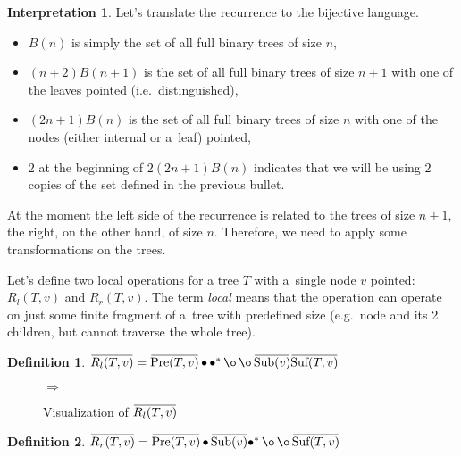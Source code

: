 \documentclass[final]{article}
\theoremstyle{definition}
\newtheorem{definition}{Definition}[subsection]
\theoremstyle{definition}
\newtheorem{interpretation}{Interpretation}[subsection]
\theoremstyle{remark}
\newcommand{\ols}[1]{\mskip.5\thinmuskip\overline{\mskip-.5\thinmuskip {#1} \mskip-.5\thinmuskip}\mskip.5\thinmuskip} %
\newcommand{\enc}[1]{\ensuremath{\ols{#1}}}
\newcommand{\pointed}[1]{\ensuremath{{#1}^*}}
\DeclareMathOperator{\tSub}{\text{Sub}}
\DeclareMathOperator{\tPre}{\text{Pre}}
\DeclareMathOperator{\tSuf}{\text{Suf}}
\DeclareMathOperator{\n}{\bullet}
\DeclareMathOperator{\no}{\o}
\begin{document}
\begin{interpretation}
Let's translate the recurrence to the bijective language.
\begin{itemize}
    \item \(B(n)\) is simply the set of all full binary trees of size \(n\),
    \item \((n + 2) B(n + 1)\) is the set of all full binary trees of size \(n + 1\) with one of the leaves pointed (i.e.~distinguished),
    \item \((2n + 1) B(n)\) is the set of all full binary trees of size \(n\) with one of the nodes (either internal or a~leaf) pointed,
    \item \(2\) at the beginning of \(2 (2n + 1) B(n)\) indicates that we will be using \(2\) copies of the set defined in the previous bullet.
\end{itemize}

At the moment the left side of the recurrence is related to the trees of size \(n + 1\), the right, on the other hand, of size \(n\). Therefore, we need to apply some transformations on the trees.

Let's define two local operations for a tree \(T\) with a~single node \(v\) pointed: \(R_l(T, v)\) and \(R_r(T, v)\). The term \textit{local} means that the operation can operate on just some finite fragment of a~tree with predefined size (e.g.~node and its 2 children, but cannot traverse the whole tree).

\begin{definition}
    \(\enc{R_l(T, v)} = \enc{\tPre(T, v)} \n \pointed{\n} \no \no \enc{\tSub(v)} \enc{\tSuf(T, v)}\)
\end{definition}

\begin{figure}[H]
    \centering
    \begin{minipage}{.25\textwidth}\end{minipage}%
    \(\Rightarrow\)
    \begin{minipage}{.4\textwidth}\end{minipage}%
    \caption{Visualization of \(\enc{R_l(T, v)}\)}%
    \label{fig:remy_left}
\end{figure}

\begin{definition}
    \(\enc{R_r(T, v)} = \enc{\tPre(T, v)} \n \enc{\tSub(v)} \pointed{\n} \no \no \enc{\tSuf(T, v)} \)
\end{definition}


\end{interpretation}
\end{document}
